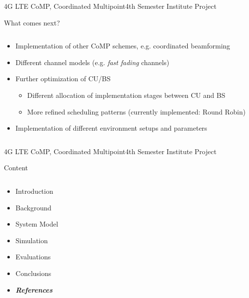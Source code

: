 \documentclass[xcolor={cmyk}]{beamer}
\begin{document}
 \begin{frame}{4G LTE CoMP, Coordinated Multipoint}{4th Semester Institute Project}
	 \begin{block}{What comes next?}
	 	\begin{columns}
			\begin{column}{.9\textwidth}
				\begin{itemize}
					\item Implementation of other CoMP schemes, e.g. coordinated beamforming
					\item Different channel models (e.g. \textit{fast fading} channels)
					\item Further optimization of CU/BS
					\begin{itemize}
						\item Different allocation of implementation stages between CU and BS
						\item More refined scheduling patterns (currently implemented: Round Robin)
					\end{itemize}
					\item Implementation of different environment setups and parameters
				\end{itemize}
			\end{column}
		\end{columns}
	 \end{block}
 \end{frame}


\begin{frame}{4G LTE CoMP, Coordinated Multipoint}{4th Semester Institute Project}
	\begin{block}{Content}
		\begin{columns}
			\begin{column}{.9\textwidth}
				\begin{itemize}
					\item Introduction
					\item Background
					\item System Model
					\item Simulation
					\item Evaluations
					\item Conclusions
					\item \textbf{\emph{References}}
				\end{itemize}
			\end{column}
		\end{columns}
	\end{block}
\end{frame}
\end{document}
